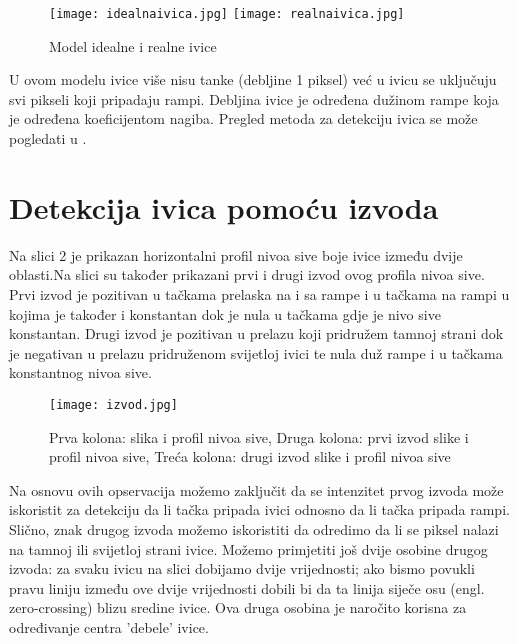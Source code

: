 ﻿\documentclass[conference]{IEEEtran}
\begin{document}
\begin{figure}[htbp]
\centerline{\texttt{[image: idealnaivica.jpg]}
   \hspace{1.5cm}
\texttt{[image: realnaivica.jpg]}
}
\caption{Model idealne i realne ivice}
\label{fig}
\end{figure}

U ovom modelu ivice više nisu tanke (debljine 1 piksel) već u ivicu se uključuju svi pikseli koji pripadaju rampi. Debljina ivice je određena dužinom rampe koja je određena koeficijentom nagiba.\cite{b1} Pregled metoda za detekciju ivica se može pogledati u \cite{b2}.


\section{Detekcija ivica pomoću izvoda}
Na slici 2 je prikazan horizontalni profil nivoa sive boje ivice između dvije oblasti.Na slici su također prikazani prvi i  drugi izvod ovog profila nivoa sive. Prvi izvod je pozitivan u tačkama prelaska na i sa rampe i u tačkama na rampi u kojima je također i konstantan dok je nula u tačkama gdje je nivo sive konstantan. Drugi izvod je pozitivan u prelazu koji pridružem tamnoj strani dok je negativan u prelazu pridruženom svijetloj ivici te nula  duž rampe i u tačkama konstantnog nivoa sive.    
\begin{figure}[htbp]
\centerline{\texttt{[image: izvod.jpg]}
}
\caption{Prva kolona: slika i profil nivoa sive, Druga kolona: prvi izvod slike i profil nivoa sive, Treća kolona: drugi izvod slike i profil nivoa sive}
\label{fig}
\end{figure}
Na osnovu ovih opservacija možemo zaključit da se intenzitet prvog izvoda može iskoristit za detekciju da li tačka pripada ivici odnosno da li tačka pripada rampi. Slično, znak drugog izvoda možemo iskoristiti da odredimo da li se piksel nalazi na tamnoj ili svijetloj strani ivice. Možemo primjetiti još dvije osobine drugog izvoda: za svaku ivicu na slici  dobijamo dvije vrijednosti; ako bismo povukli pravu liniju između ove dvije vrijednosti dobili bi da ta linija siječe osu (engl. zero-crossing) blizu sredine ivice. Ova druga osobina je naročito korisna za određivanje centra 'debele' ivice. \cite{b1}
\end{document}
